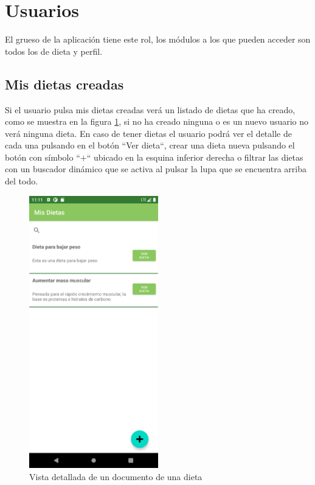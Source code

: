 \section{Usuarios}
El grueso de la aplicación tiene este rol, los módulos a los que pueden acceder son todos los de dieta y perfil.
\subsection{Mis dietas creadas} \label{user_my_created_diets}
Si el usuario pulsa mis dietas creadas verá un listado de dietas que ha creado, como se muestra en la figura \ref{fig:mis_dietas}, si no ha creado ninguna o es un nuevo usuario no verá ninguna dieta. En caso de tener dietas el usuario podrá ver el detalle de cada una pulsando en el botón ``Ver dieta``, crear una dieta nueva pulsando el botón con símbolo ``$+$`` ubicado en la esquina inferior derecha o filtrar las dietas con un buscador dinámico que se activa al pulsar la lupa que se encuentra arriba del todo.

\begin{figure}[H]
    \centering
    \includegraphics[width=0.5\textwidth]{Images/Annexes/mis_dietas.png}
    \caption{Vista detallada de un documento de una dieta}
    \label{fig:mis_dietas}
\end{figure}

